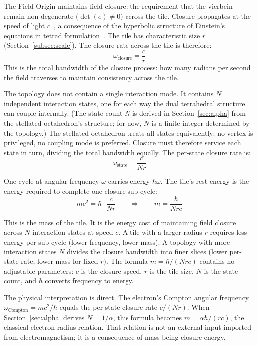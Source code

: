 \documentclass[aps,prd,preprint,superscriptaddress,showpacs,preprintnumbers,amsmath,amssymb,nofootinbib]{revtex4-2}
\begin{document}
The Field Origin maintains field closure: the requirement that the vierbein remain non-degenerate ($\det(e) \neq 0$) across the tile. Closure propagates at the speed of light $c$~\cite{abbott2016}, a consequence of the hyperbolic structure of Einstein's equations in tetrad formulation~\cite{buchman2003}. The tile has characteristic size $r$ (Section~\ref{subsec:scale}). The closure rate across the tile is therefore:
\begin{equation}
\omega_{\text{closure}} = \frac{c}{r}
\label{eq:closure-rate-tile}
\end{equation}
This is the total bandwidth of the closure process: how many radians per second the field traverses to maintain consistency across the tile.

The topology does not contain a single interaction mode. It contains $N$ independent interaction states, one for each way the dual tetrahedral structure can couple internally. (The state count $N$ is derived in Section~\ref{sec:alpha} from the stellated octahedron's structure; for now, $N$ is a finite integer determined by the topology.) The stellated octahedron treats all states equivalently: no vertex is privileged, no coupling mode is preferred. Closure must therefore service each state in turn, dividing the total bandwidth equally. The per-state closure rate is:
\begin{equation}
\omega_{\text{state}} = \frac{c}{Nr}
\label{eq:per-state-rate}
\end{equation}

One cycle at angular frequency $\omega$ carries energy $\hbar\omega$. The tile's rest energy is the energy required to complete one closure sub-cycle:
\begin{equation}
mc^2 = \hbar \cdot \frac{c}{Nr} \qquad \Longrightarrow \qquad m = \frac{\hbar}{Nrc}
\label{eq:mass-closure}
\end{equation}

This is the mass of the tile. It is the energy cost of maintaining field closure across $N$ interaction states at speed $c$. A tile with a larger radius $r$ requires less energy per sub-cycle (lower frequency, lower mass). A topology with more interaction states $N$ divides the closure bandwidth into finer slices (lower per-state rate, lower mass for fixed $r$). The formula $m = \hbar/(Nrc)$ contains no adjustable parameters: $c$ is the closure speed, $r$ is the tile size, $N$ is the state count, and $\hbar$ converts frequency to energy.

The physical interpretation is direct. The electron's Compton angular frequency $\omega_{\text{Compton}} = mc^2/\hbar$ equals the per-state closure rate $c/(Nr)$. When Section~\ref{sec:alpha} derives $N = 1/\alpha$, this formula becomes $m = \alpha\hbar/(rc)$, the classical electron radius relation. That relation is not an external input imported from electromagnetism; it is a consequence of mass being closure energy.
\end{document}
